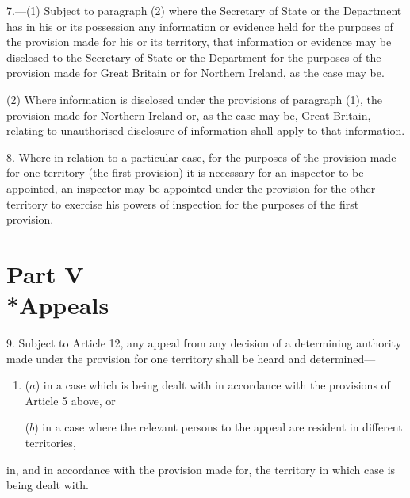 \documentclass[12pt,a4paper]{article}
\begin{document}
7.—(1) Subject to paragraph (2) where the Secretary of State
or the Department  %
has in his or its possession any information or evidence held for the purposes of the provision made for his or its territory, that information or evidence may be disclosed to the Secretary of State
or the Department  %
for the purposes of the provision made for Great Britain or for Northern Ireland, as the case may be.

(2) Where information is disclosed under the provisions of paragraph (1), the provision made for Northern Ireland or, as the case may be, Great Britain, relating to unauthorised disclosure of information shall apply to that information.


\medskip

8.  Where in relation to a particular case, for the purposes of the provision made for one territory (the first provision) it is necessary for an inspector to be appointed, an inspector may be appointed under the provision for the other territory to exercise his powers of inspection for the purposes of the first provision.

\section[Part V --- Appeals]{Part V\\*Appeals}

\renewcommand\parthead{--- Schedule 1 Part V}

9.  Subject to Article 12, any appeal from any decision of a determining authority made under the provision for one territory shall be heard and determined—
\begin{enumerate}\item[]
($a$) in a case which is being dealt with in accordance with the provisions of Article 5 above, or

($b$) in a case where the relevant persons to the appeal are resident in different territories,
\end{enumerate}
in, and in accordance with the provision made for, the territory in which case is being dealt with.
\end{document}
